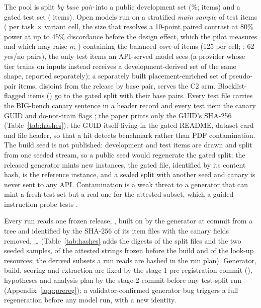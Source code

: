 The pool is split \emph{by base pair} into a public development set (\releaseDevPercent{}\%; \releaseNDev{} items) and a gated test set (\releaseNTest{} items). Open models run on a stratified \emph{main sample} of \releaseNMain{} test items (\releaseMainPerCell{} per task $\times$ variant cell, the size that resolves a 10-point paired contrast at 80\% power at up to 45\% discordance before the design effect, which the pilot measures and which may raise $n$; ) containing the balanced \emph{core} of \releaseNCore{} items (125 per cell; : 62 yes/no pairs), the only \noilai{} test items an API-served model sees (a provider whose tier trains on inputs instead receives a development-derived set of the same shape, reported separately); a separately built placement-enriched set of \releaseNCtwo{} pseudo-pair items, disjoint from the release by base pair, serves the C2 arm. Blocklist-flagged items (\releaseNVulgar{}) go to the gated split with their base pairs. Every test file carries the BIG-bench canary sentence in a header record and every test item the canary GUID and do-not-train flags \citep{2023-emnlp-main-308,srivastava-etal-2023-beyond}; the paper prints only the GUID's SHA-256 (Table~\ref{tab:hashes}), the GUID itself living in the gated README, dataset card and file header, so that a hit detects benchmark rather than PDF contamination. The build seed is not published: development and test items are drawn and split from one seeded stream, so a public seed would regenerate the gated split; the released generator mints new instances, the gated file, identified by its content hash, is the reference instance, and a sealed split with another seed and canary is never sent to any API. Contamination is a weak threat to a generator that can mint a fresh test set but a real one for the attested subset, which a guided-instruction probe tests \citep{2308.08493}.

Every run reads one frozen release, \releaseVersion{}, built on \releaseBuiltOn{} by the generator at commit \releaseGeneratorCommit{} from a \releaseGitDirty{} tree and identified by the SHA-256 of its item files with the canary fields removed, \texttt{\releaseContentShaShort{}}\ldots{} (Table~\ref{tab:hashes} adds the digests of the split files and the two seeded samples, of the attested strings frozen before the build and of the look-up resources; the derived subsets a run reads are hashed in the run plan). Generator, build, scoring and extraction are fixed by the stage-1 pre-registration commit (), hypotheses and analysis plan by the stage-2 commit before any test-split run (Appendix~\ref{app:prereg}); a validator-confirmed generator bug triggers a full regeneration before any model run, with a new identity.

